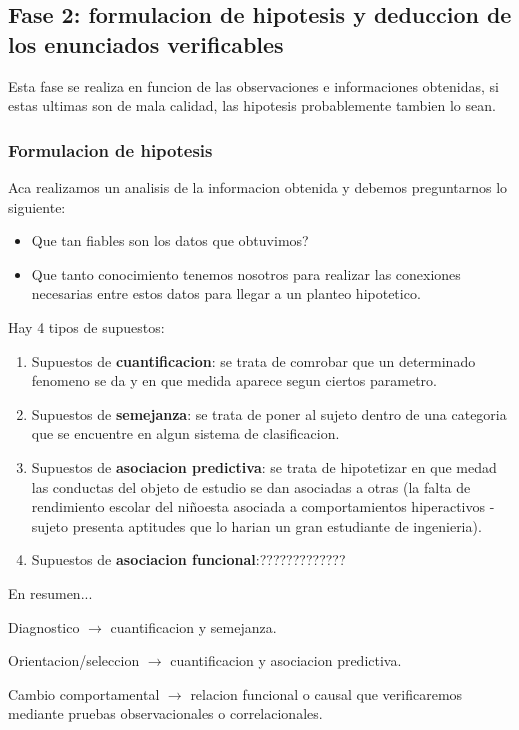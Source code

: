 \documentclass[12pt,a4paper]{article}
\begin{document}
\subsection{Fase 2: formulacion de hipotesis y deduccion de los enunciados verificables}%

Esta fase se realiza en funcion de las observaciones e informaciones obtenidas, si estas ultimas son de mala calidad, las hipotesis probablemente tambien lo sean. 

\subsubsection{Formulacion de hipotesis}%

Aca realizamos un analisis de la informacion obtenida y debemos preguntarnos lo siguiente:

\begin{itemize}
	\item Que tan fiables son los datos que obtuvimos?
	\item Que tanto conocimiento tenemos nosotros para realizar las conexiones necesarias entre estos datos para llegar a un planteo hipotetico.
\end{itemize}

Hay 4 tipos de supuestos:

\begin{enumerate}
	\item Supuestos de \textbf{cuantificacion}: se trata de comrobar que un determinado fenomeno se da y en que medida aparece segun ciertos parametro.
	
	\item Supuestos de \textbf{semejanza}: se trata de poner al sujeto dentro de una categoria que se encuentre en algun sistema de clasificacion. 

	\item Supuestos de \textbf{asociacion predictiva}: se trata de hipotetizar en que medad las conductas del objeto de estudio se dan asociadas a otras (la falta de rendimiento escolar del niñoesta asociada a comportamientos hiperactivos - sujeto presenta aptitudes que lo harian un gran estudiante de ingenieria).

	\item Supuestos de \textbf{asociacion funcional}:????????????? 
\end{enumerate}

En resumen...

\begin{shaded}
Diagnostico $\rightarrow$ cuantificacion y semejanza.

Orientacion/seleccion $\rightarrow$ cuantificacion y asociacion predictiva.

Cambio comportamental $\rightarrow$ relacion funcional o causal que verificaremos mediante pruebas observacionales o correlacionales.
\end{shaded}
\end{document}
